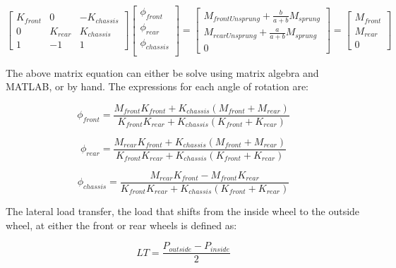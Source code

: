 \documentclass[a4paper]{article}
\numberwithin{equation}{section}
\begin{document}
\begin{equation}
	\begin{bmatrix}
		K_{front} & 0 & -K_{chassis}\\
		0 & K_{rear} & K_{chassis}\\
		1 & -1 & 1
	\end{bmatrix}
	\begin{bmatrix}
		\phi_{front}\\
		\phi_{rear}\\
		\phi_{chassis}\\
	\end{bmatrix}
	=
	\begin{bmatrix}
		M_{frontUnsprung} + \frac{b}{a+b}M_{sprung}\\
		M_{rearUnsprung} + \frac{a}{a+b}M_{sprung}\\
		0
	\end{bmatrix}
	=
	\begin{bmatrix}
		M_{front}\\
		M_{rear}\\
		0
	\end{bmatrix}
	\label{equ: model system}
\end{equation}

The above matrix equation can either be solve using matrix algebra and MATLAB, or by hand. The expressions for each angle of rotation are:

\begin{equation}
	\phi_{front} = \frac{M_{front} K_{front}+K_{chassis} (M_{front}+M_{rear})}{K_{front} K_{rear}+K_{chassis} (K_{front}+K_{rear})}	
	\label{equ: phi front}
\end{equation}

\begin{equation}
	\phi_{rear} = \frac{M_{rear} K_{front}+K_{chassis} (M_{front}+M_{rear})}{K_{front} K_{rear}+K_{chassis} (K_{front}+K_{rear})}
	\label{equ: phi rear}
\end{equation}

\begin{equation}
	\phi_{chassis} = \frac{M_{rear} K_{front}-M_{front}K_{rear}}{K_{front} K_{rear}+K_{chassis} (K_{front}+K_{rear})}
	\label{equ: phi chassis}
\end{equation}

The lateral load transfer, the load that shifts from the inside wheel to the outside wheel, at either the front or rear wheels is defined as:

\begin{equation}
	LT = \frac{P_{outside}-P_{inside}}{2}
	\label{equ: load transfer}
\end{equation}
\end{document}
